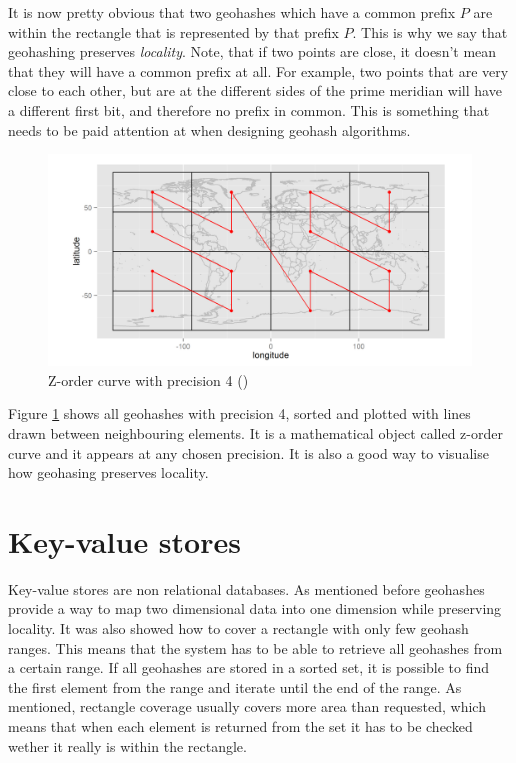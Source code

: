 \documentclass[times, utf8, diplomski]{fer}
\begin{document}
It is now pretty obvious that two geohashes which have a common prefix $P$ are within the rectangle that is represented by that prefix $P$. This is why we say that geohashing preserves \emph{locality}. Note, that if two points are close, it doesn't mean that they will have a common prefix at all. For example, two points that are very close to each other, but are at the different sides of the prime meridian will have a different first bit, and therefore no prefix in common. This is something that needs to be paid attention at when designing geohash algorithms.

\begin{figure}[h]
\includegraphics[width=\textwidth]{z_curve}
\caption{Z-order curve with precision 4 (\citet {spatiotemporal})}
\label{fig:zcurve}
\end{figure}

Figure \ref{fig:zcurve} shows all geohashes with precision 4, sorted and plotted with lines drawn between neighbouring elements. It is a mathematical object called z-order curve \cite{zcurve} and it appears at any chosen precision. It is also a good way to visualise how geohasing preserves locality.

\section{Key-value stores} \label{key-value}
Key-value stores are non relational databases.
As mentioned before geohashes provide a way to map two dimensional data into one dimension while preserving locality. It was also showed how to cover a rectangle with only few geohash ranges. This means that the system has to be able to retrieve all geohashes from a certain range. If all geohashes are stored in a sorted set, it is possible to find the first element from the range and iterate until the end of the range. As mentioned, rectangle coverage usually covers more area than requested, which means that when each element is returned from the set it has to be checked wether it really is within the rectangle.
\end{document}
